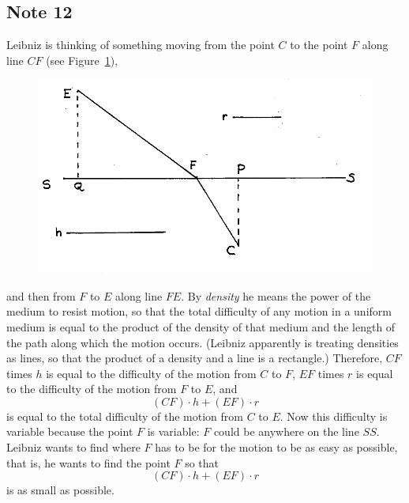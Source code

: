 \documentclass[polutonikogreek,english,twoside,openright]{article}
\begin{document}
\subsection*{Note 12}
\label{cnm12}

Leibniz is thinking of something moving from the point $C$ to the
point $F$ along line $CF$ (see Figure~\ref{leasttimeA}),
\begin{figure}[htp]
\begin{center}
\includegraphics[width=.85\textwidth]{fig/Figure21}
\caption{}
\label{leasttimeA}
\vspace{-10pt}
\end{center}
\end{figure} and then from $F$ to $E$ along line $FE$.  By {\em
  density} he means the power of the medium to resist motion, so that
the total difficulty of any motion in a uniform medium is equal to the
product of the density of that medium and the length of the path along
which the motion occurs.  (Leibniz apparently is treating densities as
lines, so that the product of a density and a line is a rectangle.)
Therefore, $CF$ times $h$ is equal to the difficulty of the motion
from $C$ to $F$, $EF$ times $r$ is equal to the difficulty of the
motion from $F$ to $E$, and
$$(CF)\cdot h + (EF) \cdot r$$
is equal to the total difficulty of the motion from $C$ to $E$.  Now
this difficulty is variable because the point $F$ is variable: $F$
could be anywhere on the line $SS$.  Leibniz wants to find where $F$
has to be for the motion to be as easy as possible, that is, he wants
to find the point $F$ so that
$$(CF)\cdot h + (EF) \cdot r$$
is as small as possible.
\end{document}
